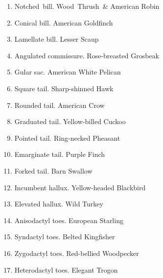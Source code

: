 \documentclass[11pt]{article}
\begin{document}
\begin{multicols}{2}
\begin{enumerate}[itemsep=1cm]
\item Notched~bill. Wood~Thrush~\& American Robin
\item Conical bill. \newline American Goldfinch
\item Lamellate bill. \newline Lesser Scaup
\item Angulated commissure. \newline Rose-breasted Grosbeak
\item Gular sac. \newline American White Pelican

\item Square tail. \newline Sharp-shinned Hawk
\item Rounded tail. \newline American Crow
\item Graduated tail. \newline Yellow-billed Cuckoo
\item Pointed tail. \newline Ring-necked Pheasant
\item Emarginate tail. \newline Purple Finch
\item Forked tail. \newline Barn Swallow

\item Incumbent hallux. \newline Yellow-headed Blackbird
\item Elevated hallux. \newline Wild Turkey
\item Anisodactyl toes. \newline European Starling
\item Syndactyl toes. \newline Belted Kingfisher
\item Zygodactyl toes. \newline Red-bellied Woodpecker
\item Heterodactyl toes. \newline Elegant Trogon


\end{enumerate}
\end{multicols}
\end{document}
